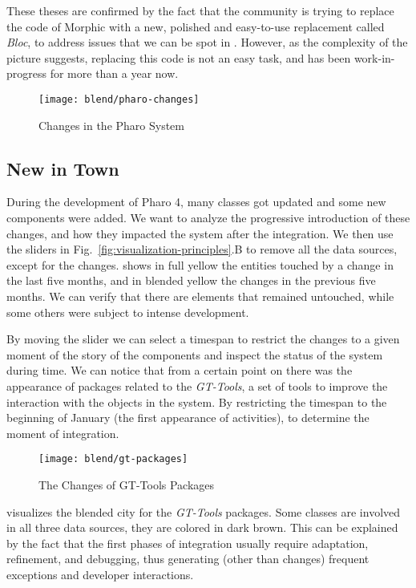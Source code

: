 These theses are confirmed by the fact that the community is trying to replace the code of Morphic with a new, polished and easy-to-use replacement called \textit{Bloc}, to address issues that we can be spot in .
However, as the complexity of the picture suggests, replacing this code is not an easy task, and has been work-in-progress for more than a year now.



\begin{figure*}[ht]
\centering
\texttt{[image: blend/pharo-changes]}
\caption{Changes in the Pharo System}
\label{fig:pharo-changes}
\end{figure*}

\subsection{New in Town}

During the development of Pharo 4, many classes got updated and some new components were added.
We want to analyze the progressive introduction of these changes, and how they impacted the system after the integration.
We then use the sliders in Fig.~\ref{fig:visualization-principles}.B to remove all the data sources, except for the changes.
 shows in full yellow the entities touched by a change in the last five months, and in blended yellow the changes in the previous five months.
We can verify that there are elements that remained untouched, while some others were subject to intense development.

By moving the slider we can select a timespan to restrict the changes to a given moment of the story of the components and inspect the status of the system during time.
We can notice that from a certain point on there was the appearance of packages related to the \emph{GT-Tools}, a set of tools to improve the interaction with the objects in the system.
By restricting the timespan to the beginning of January (\ie the first appearance of activities), to determine the moment of integration.

\begin{figure}[h]
\centering
\texttt{[image: blend/gt-packages]}
\caption{The Changes of GT-Tools Packages}
\label{fig:gt-spotter-packages}
\end{figure}

 visualizes the blended city for the \emph{GT-Tools} packages.
Some classes are involved in all three data sources, \ie they are colored in dark brown.
This can be explained by the fact that the first phases of integration usually require adaptation, refinement, and debugging, thus generating (other than changes) frequent exceptions and developer interactions.

